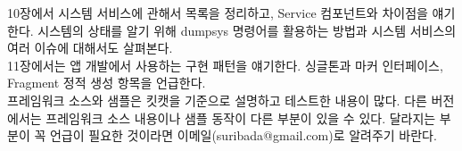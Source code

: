 \documentclass[a4paper,hidelinks,10pt,openany]{book} %
\begin{document}
10장에서 시스템 서비스에 관해서 목록을 정리하고, Service 컴포넌트와 차이점을 얘기한다. 시스템의 상태를 알기 위해 dumpsys 명령어를 활용하는 방법과 시스템 서비스의 여러 이슈에 대해서도 살펴본다.\\

11장에서는 앱 개발에서 사용하는 구현 패턴을 얘기한다. 싱글톤과 마커 인터페이스, Fragment 정적 생성 항목을 언급한다.\\

프레임워크 소스와 샘플은 킷캣을 기준으로 설명하고 테스트한 내용이 많다. 다른 버전에서는 프레임워크 소스 내용이나 샘플 동작이 다른 부분이 있을 수 있다. 달라지는 부분이 꼭 언급이 필요한 것이라면 이메일(suribada@gmail.com)로 알려주기 바란다.









%









\ 
%

%
%




\end{document}

